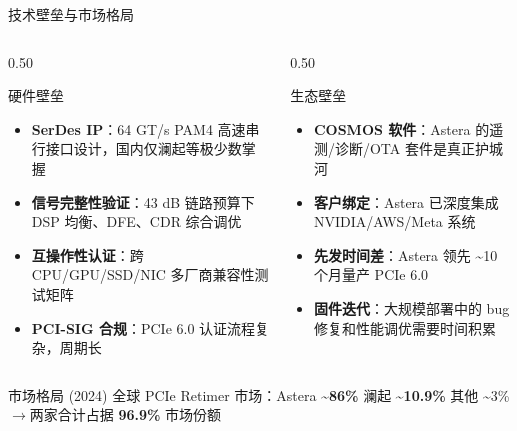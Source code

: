 \documentclass[aspectratio=169, 10pt, UTF8]{ctexbeamer}
\begin{document}
\begin{frame}{技术壁垒与市场格局}
  \begin{columns}[T]
    \begin{column}{0.50\textwidth}
      \begin{block}{硬件壁垒}
        \begin{itemize}
          \item \textbf{SerDes IP}：64 GT/s PAM4 高速串行接口设计，国内仅澜起等极少数掌握
          \item \textbf{信号完整性验证}：43 dB 链路预算下 DSP 均衡、DFE、CDR 综合调优
          \item \textbf{互操作性认证}：跨 CPU/GPU/SSD/NIC 多厂商兼容性测试矩阵
          \item \textbf{PCI-SIG 合规}：PCIe 6.0 认证流程复杂，周期长
        \end{itemize}
      \end{block}
    \end{column}
    \begin{column}{0.50\textwidth}
      \begin{alertblock}{生态壁垒}
        \begin{itemize}
          \item \textbf{COSMOS 软件}：Astera 的遥测/诊断/OTA 套件是真正护城河
          \item \textbf{客户绑定}：Astera 已深度集成 NVIDIA/AWS/Meta 系统
          \item \textbf{先发时间差}：Astera 领先 \textasciitilde10 个月量产 PCIe 6.0
          \item \textbf{固件迭代}：大规模部署中的 bug 修复和性能调优需要时间积累
        \end{itemize}
      \end{alertblock}
    \end{column}
  \end{columns}

  \vspace{8pt}
  \begin{exampleblock}{市场格局 (2024)}
    \centering
    全球 PCIe Retimer 市场：Astera \textbf{\textasciitilde86\%} \quad 澜起 \textbf{\textasciitilde10.9\%} \quad 其他 \textasciitilde3\%
    \quad$\to$\quad 两家合计占据 \textbf{96.9\%} 市场份额
  \end{exampleblock}
\end{frame}
\end{document}

